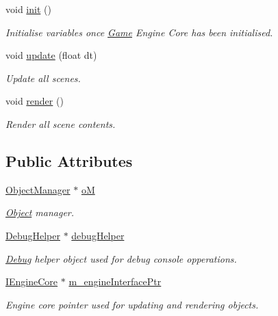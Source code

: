 \begin{DoxyCompactItemize}
void \mbox{\hyperlink{class_game_a6f3a33940524b6ba9d83f627ccb14bbf}{init}} ()
\begin{DoxyCompactList}\small\item\em Initialise variables once \mbox{\hyperlink{class_game}{Game}} Engine Core has been initialised. \end{DoxyCompactList}\item 
\mbox{\label{class_game_a2648dc91da0dd1424d5b7c45510515a0}} 
void \mbox{\hyperlink{class_game_a2648dc91da0dd1424d5b7c45510515a0}{update}} (float dt)
\begin{DoxyCompactList}\small\item\em Update all scenes. \end{DoxyCompactList}\item 
\mbox{\label{class_game_a15ddd769261d923827a3cdf41499c843}} 
void \mbox{\hyperlink{class_game_a15ddd769261d923827a3cdf41499c843}{render}} ()
\begin{DoxyCompactList}\small\item\em Render all scene contents. \end{DoxyCompactList}\end{DoxyCompactItemize}
\subsection*{Public Attributes}
\begin{DoxyCompactItemize}
\item 
\mbox{\label{class_game_a713d1977c05e5003d15492eb036eacf4}} 
\mbox{\hyperlink{class_object_manager}{Object\+Manager}} $\ast$ \mbox{\hyperlink{class_game_a713d1977c05e5003d15492eb036eacf4}{oM}}
\begin{DoxyCompactList}\small\item\em \mbox{\hyperlink{class_object}{Object}} manager. \end{DoxyCompactList}\item 
\mbox{\label{class_game_a4efa8c90dc6278091beaa1313c6a9bdc}} 
\mbox{\hyperlink{class_debug_helper}{Debug\+Helper}} $\ast$ \mbox{\hyperlink{class_game_a4efa8c90dc6278091beaa1313c6a9bdc}{debug\+Helper}}
\begin{DoxyCompactList}\small\item\em \mbox{\hyperlink{class_debug}{Debug}} helper object used for debug console opperations. \end{DoxyCompactList}\item 
\mbox{\label{class_game_ad01d32edc479a3edc79e5a3d7b4281d2}} 
\mbox{\hyperlink{class_i_engine_core}{I\+Engine\+Core}} $\ast$ \mbox{\hyperlink{class_game_ad01d32edc479a3edc79e5a3d7b4281d2}{m\+\_\+engine\+Interface\+Ptr}}
\begin{DoxyCompactList}\small\item\em Engine core pointer used for updating and rendering objects. \end{DoxyCompactList}\end{DoxyCompactItemize}


